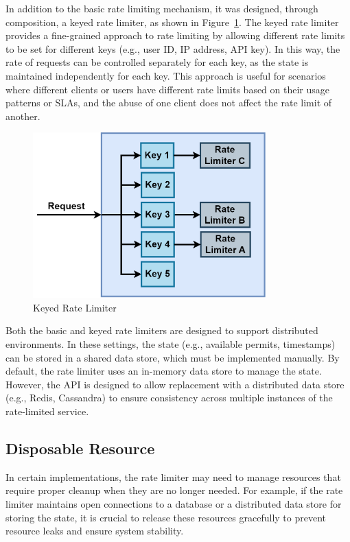 In addition to the basic rate limiting mechanism, it was designed, through composition, a keyed rate limiter, as shown in Figure~\ref{fig:keyed-rate-limiter}.
The keyed rate limiter provides a fine-grained approach to rate limiting
by allowing different rate limits to be set for different keys
(e.g., user ID, IP address, API key).
In this way, the rate of requests can be controlled separately for each key, as the state is maintained
independently for each key.
This approach is useful for scenarios
where different clients or users have different rate limits based on their usage patterns or SLAs,
and the abuse of one client does not affect the rate limit of another.

\begin{figure}[!htb]
    \centering
    \includegraphics[width=0.8\textwidth]{../figures/06_keyed-rate-limiter}
    \caption{Keyed Rate Limiter}
    \label{fig:keyed-rate-limiter}
\end{figure}

Both the basic and keyed rate limiters are designed to support distributed environments.
In these settings, the state (e.g., available permits, timestamps) can be stored in a shared data store,
which must be implemented manually.
By default, the rate limiter uses an in-memory data store to manage the state.
However,
the API is designed to allow replacement with a distributed data store
(e.g., Redis, Cassandra) to ensure consistency across multiple instances of the rate-limited service.

\subsection{Disposable Resource}\label{subsec:rate-limiter-disposable-resource}

In certain implementations, the rate limiter may need to manage resources that require proper cleanup when they are no longer needed.
For example, if the rate limiter maintains open connections to a database or a distributed data store
for storing the state, it is crucial to release these resources gracefully to prevent resource leaks and ensure system stability.


